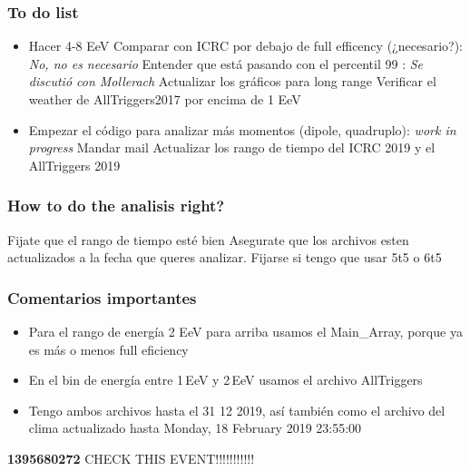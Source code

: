 


\subsubsection*{To do list }
		\begin{itemize}
			\done (DONE) ¿estoy haciendo bien la cuenta? 
			\done (DONE) el log en ln o log10 para cpp? es ln==log en cpp
			\done¿Hay algo en la aproximación de rayleigh que se pasó por alto? Sigo buscando
			\done (DONE?) ¿Entiendo bien la approx? --Creo que sí, leí el paper que referencian, pero puede que un detalle se me halla escapado
	\item Hacer 4-8 EeV
	\done Comparar con ICRC por debajo de full efficency (¿necesario?): {\sl No, no es necesario}
	\done Entender que está pasando con el percentil 99 : {\sl Se discutió con Mollerach}
	 Actualizar los gráficos para long range 
	 Verificar el weather de AllTriggers2017 por encima de 1 EeV
	\item Empezar el código para analizar más momentos (dipole, quadruplo): {\sl work in progress}
	 Mandar mail
	\done Actualizar los rango de tiempo del ICRC 2019 y el AllTriggers 2019
\end{itemize}



\subsubsection*{How to do the analisis right?}

\begin{itemize}
	\done Fijate que el rango de tiempo esté bien
	\done Asegurate que los archivos esten actualizados a la fecha que queres analizar.
	\done Fijarse si tengo que usar 5t5 o 6t5
\end{itemize}

\subsubsection*{Comentarios importantes}

\begin{itemize}
	\item Para el rango de energía 2 EeV para arriba usamos el  Main\_Array, porque ya es más o menos full eficiency
	\item En el bin de energía entre 1\,EeV y 2\,EeV usamos el archivo AllTriggers
	\item Tengo ambos archivos hasta el 31 12 2019, así también como el archivo del clima actualizado hasta  Monday, 18 February 2019 23:55:00
\end{itemize}



{\bf 1395680272} CHECK THIS EVENT!!!!!!!!!!!